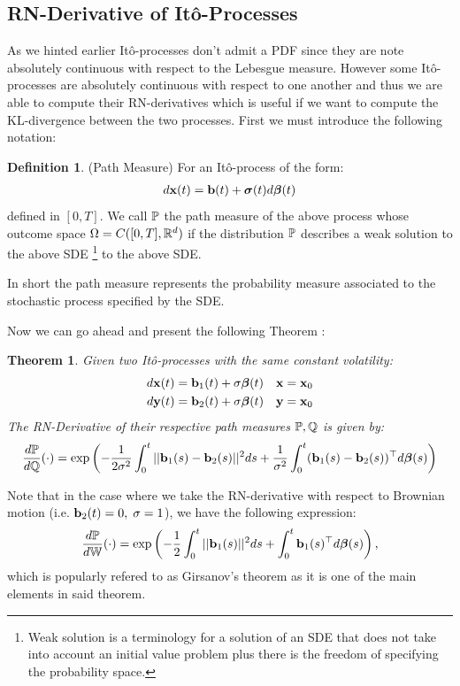 \documentclass[a4paper,12pt,twoside,openright]{report}
\newtheorem{theorem}{Theorem}
\theoremstyle{definition}
\newtheorem{definition}{Definition}[section]
\begin{document}
\subsection{RN-Derivative of Itô-Processes}


As we hinted earlier Itô-processes don't admit a PDF since they are note absolutely continuous with respect to the Lebesgue measure. However some Itô-processes are absolutely continuous with respect to one another and thus we are able to compute their RN-derivatives which is useful if we want to compute the KL-divergence between the two processes.  First we must introduce the following notation:
\begin{definition} (Path Measure)
    For an Itô-process of the form:
    \begin{align*}
        d\rvx(t) = \rvb(t) + \rvsigma(t) d\rvw(t)
    \end{align*}
    defined in $[0,T]$. We call $\P$ the path measure of the above process whose outcome space $\Omega=C([0,T], \R^d)$ if the distribution $\P$ describes a weak solution to the above SDE \footnote{Weak solution is a terminology for a solution of an SDE that does not take into account an initial value problem plus there is the freedom of specifying the probability space.} to the above SDE.
\end{definition}

In short the path measure represents the probability measure associated to the stochastic process specified by the SDE. 

Now we can go ahead and present the following Theorem \citep{sarkka2019applied}:
\begin{theorem}\label{thrm:ito_ratio}\citep{sarkka2019applied}
Given two Itô-processes with the same constant volatility: 
    \begin{align*}
        d\rvx(t) = \rvb_1(t) + \sigma \rvw(t) \quad \rvx = \rvx_0\\
        d\rvy(t) = \rvb_2(t) + \sigma\rvw(t) \quad \rvy = \rvx_0
    \end{align*}
The RN-Derivative of their respective path measures $\P,\Q$ is given by:
\begin{align} \label{eq:girsanov}
    \frac{d\P}{d\Q}(\cdot) = \exp\left(-\frac{1}{2\sigma^2}\int_0^t ||\rvb_1(s) - \rvb_2(s)||^2 ds + \frac{1}{\sigma^2}\int_0^t (\rvb_1(s) - \rvb_2(s))^{\top}d\rvw(s) \right)
\end{align}
\end{theorem}
Note that in the case where we take the RN-derivative with respect to Brownian motion (i.e. $\rvb_2(t) =0, \; \sigma=1$), we have the following expression:
\begin{align} \label{eq:girsanov_0}
    \frac{d\P}{d\W}(\cdot) = \exp\left(-\frac{1}{2}\int_0^t ||\rvb_1(s) ||^2 ds + \int_0^t \rvb_1(s)^{\top}d\rvw(s) \right),
\end{align}
which is popularly refered to as Girsanov's theorem as it is one of the main elements in said theorem.
\end{document}
